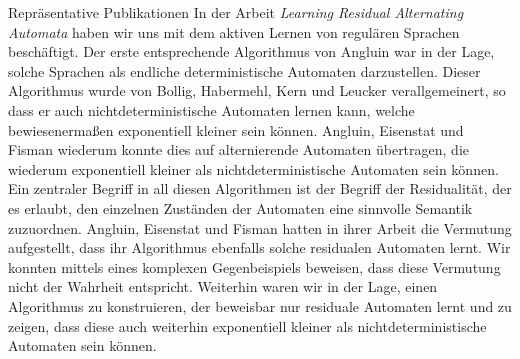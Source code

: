 \begin{rubric}{Repräsentative Publikationen}
  \entry*[AAI 2017] In der Arbeit \emph{Learning Residual Alternating Automata} haben wir uns mit dem aktiven Lernen von regulären Sprachen beschäftigt. Der erste entsprechende Algorithmus von Angluin war in der Lage, solche Sprachen als endliche deterministische Automaten darzustellen. Dieser Algorithmus wurde von Bollig, Habermehl, Kern und Leucker verallgemeinert, so dass er auch nichtdeterministische Automaten lernen kann, welche bewiesenermaßen exponentiell kleiner sein können. Angluin, Eisenstat und Fisman wiederum konnte dies auf alternierende Automaten übertragen, die wiederum exponentiell kleiner als nichtdeterministische Automaten sein können. Ein zentraler Begriff in all diesen Algorithmen ist der Begriff der Residualität, der es erlaubt, den einzelnen Zuständen der Automaten eine sinnvolle Semantik zuzuordnen. Angluin, Eisenstat und Fisman hatten in ihrer Arbeit die Vermutung aufgestellt, dass ihr Algorithmus ebenfalls solche residualen Automaten lernt. Wir konnten mittels eines komplexen Gegenbeispiels beweisen, dass diese Vermutung nicht der Wahrheit entspricht. Weiterhin waren wir in der Lage, einen Algorithmus zu konstruieren, der beweisbar nur residuale Automaten lernt und zu zeigen, dass diese auch weiterhin exponentiell kleiner als nichtdeterministische Automaten sein können. 

\end{rubric}